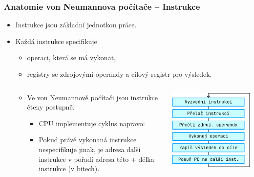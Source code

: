 \documentclass[aspectratio=169,11pt,svgnames,handout]{beamer}
\begin{document}
\begin{frame}
 \frametitle{Anatomie von Neumannova počítače -- Instrukce}
 \begin{itemize}[label=\textbullet]
  \item Instrukce jsou základní jednotkou práce.\pause
  \item Každá instrukce specifikuje
  \begin{itemize}[label=\textemdash]
   \item \alert{operaci}, která se má vykonat,\pause
   \item registry se zdrojovými \alert{operandy} a \alert{cílový registr} pro
    výsledek.
  \end{itemize}
  \begin{columns}[T]
   \begin{column}{.65\textwidth}
    \begin{itemize}[label=\textbullet]
     \item Ve von Neumannově počítači jsou instrukce čteny postupně.\pause
     \begin{itemize}[label=\textemdash]
      \item CPU implementuje cyklus napravo:
      \item Pokud právě vykonaná instrukce nespecifikuje jinak, je adresa další
       instrukce v pořadí adresa této + délka instrukce (v bitech).
     \end{itemize}
    \end{itemize}
   \end{column}
   \begin{column}{.29\textwidth}
    \begin{center}
     \includegraphics[width=\textwidth]{instruction-reading.pdf}
    \end{center}
   \end{column}
  \end{columns}
 \end{itemize}
\end{frame}
\end{document}
